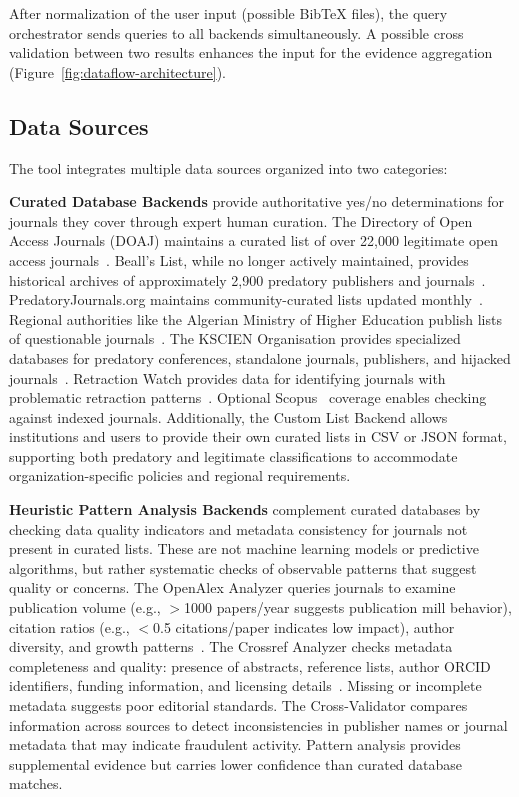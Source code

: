 \documentclass[fleqn,10pt]{SelfArx}
\begin{document}
After normalization of the user input (possible BibTeX files), the
query orchestrator sends queries to all backends simultaneously.
A possible cross validation between two results enhances the input
for the evidence aggregation (Figure~\ref{fig:dataflow-architecture}). 

\subsection{Data Sources}

The tool integrates multiple data sources organized into two
categories:

\textbf{Curated Database Backends} provide authoritative yes/no
determinations for journals they cover through expert human curation.
The Directory of Open Access Journals (DOAJ) maintains a curated list
of over 22,000 legitimate open access journals~\cite{doaj}. Beall's
List, while no longer actively maintained, provides historical
archives of approximately 2,900 predatory publishers and
journals~\cite{bealls_list}. PredatoryJournals.org maintains
community-curated lists updated
monthly~\cite{predatoryjournals}. Regional authorities like the
Algerian Ministry of Higher Education publish lists of questionable
journals~\cite{DGRSDT2024}. The KSCIEN Organisation provides
specialized databases for predatory conferences, standalone journals,
publishers, and hijacked journals~\cite{kscien}. Retraction Watch
provides data for identifying journals with problematic retraction
patterns~\cite{retraction_watch}. Optional Scopus~\cite{scopus} coverage
enables checking against indexed journals. Additionally, the Custom List
Backend allows institutions and users to provide their own curated
lists in CSV or JSON format, supporting both predatory and legitimate
classifications to accommodate organization-specific policies and
regional requirements.

\textbf{Heuristic Pattern Analysis Backends} complement curated
databases by checking data quality indicators and metadata consistency
for journals not present in curated lists. These are not machine
learning models or predictive algorithms, but rather systematic checks
of observable patterns that suggest quality or concerns. The OpenAlex
Analyzer queries journals to examine publication volume
(e.g., $>$1000 papers/year suggests publication mill behavior), citation
ratios (e.g., $<$0.5 citations/paper indicates low impact), author
diversity, and growth patterns~\cite{openalex}. The Crossref Analyzer
checks metadata completeness and quality: presence of abstracts,
reference lists, author ORCID identifiers, funding information, and
licensing details~\cite{crossref}. Missing or incomplete metadata
suggests poor editorial standards. The Cross-Validator compares
information across sources to detect inconsistencies in publisher
names or journal metadata that may indicate fraudulent
activity. Pattern analysis provides supplemental evidence but carries
lower confidence than curated database matches.
\end{document}
